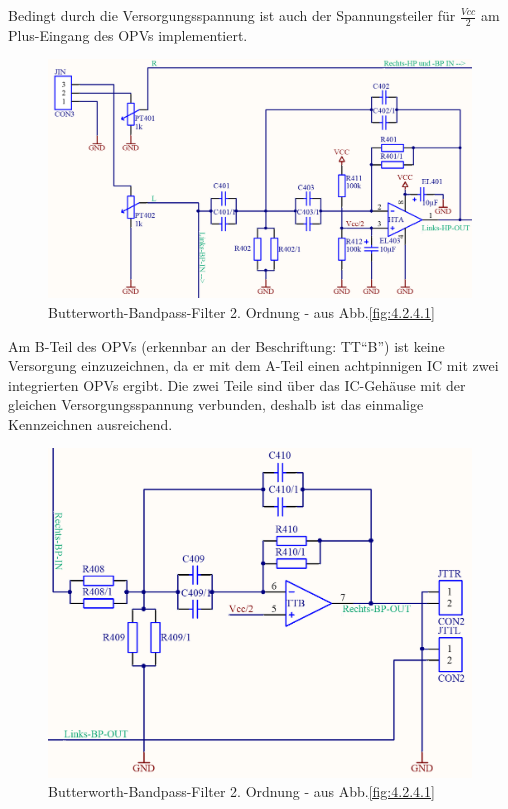Bedingt durch die Versorgungsspannung ist auch der Spannungsteiler für $\frac{Vcc}{2}$ am Plus-Eingang des OPVs implementiert.
\begin{figure} [H]
	\centering	
	\includegraphics[width=1\textwidth]{img/Print4/4_TTuHTWeiche-LinksHP-Schematic.PNG}
	\caption{Butterworth-Bandpass-Filter 2. Ordnung - aus Abb.\ref{fig:4.2.4.1}}
	\label {fig:4.2.4.2}
\end{figure}
Am B-Teil des OPVs (erkennbar an der Beschriftung: TT\enquote{B}) ist keine Versorgung einzuzeichnen, da er mit dem A-Teil einen achtpinnigen IC mit zwei integrierten OPVs ergibt. Die zwei Teile sind über das IC-Gehäuse mit der gleichen Versorgungsspannung verbunden, deshalb ist das einmalige Kennzeichnen ausreichend.\\
\begin{figure} [H]
	\centering	
	\includegraphics[width=1\textwidth]{img/Print4/4_TTuHTWeiche-RechtsBP-Schematic.PNG}
	\caption{Butterworth-Bandpass-Filter 2. Ordnung - aus Abb.\ref{fig:4.2.4.1}}
	\label {fig:4.2.4.3}
\end{figure}

